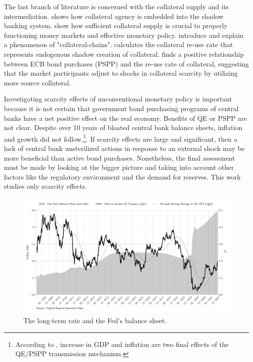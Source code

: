 \documentclass[11pt,a4paper,english,oneside]{article}
\begin{document}
The last branch of literature is concerned with the collateral supply and its intermediation. \citet{singh2011} shows how collateral agency is embedded into the shadow banking system. \citet{sissoko2020} show how sufficient collateral supply is crucial to properly functioning money markets and effective monetary policy. \citet{singh2012} introduce and explain a phenomenon of "collateral-chains". \citet{singh2017} calculates the collateral re-use rate that represents endogenous shadow creation of collateral. \citet{jank2021} finds a positive relationship between ECB bond purchases (PSPP) and the re-use rate of collateral, suggesting that the market participants adjust to shocks in collateral scarcity by utilizing more source collateral.

Investigating scarcity effects of unconventional monetary policy is important because it is not certain that government bond purchasing programs of central banks have a net positive effect on the real economy. Benefits of QE or PSPP are not clear. Despite over 10 years of bloated central bank balance sheets, inflation and growth did not follow.\footnote{According to \citet{gern2015}, increase in GDP and inflation are two final effects of the QE/PSPP transmission mechanism.}. If scarcity effects are large and significant, then a lack of central bank unsterilized actions in response to an external shock may be more beneficial than active bond purchases. Nonetheless, the final assessment must be made by looking at the bigger picture and taking into account other factors like the regulatory environment and the demand for reserves. This work studies only scarcity effects.

\begin{figure}[htb!]
  \begin{center}
    \caption{The long-term rate and the Fed's balance sheet.}
    \label{Feds_BS}
    \includegraphics[width=0.99\linewidth]{fed_bs.pdf}
  \end{center}
\end{figure}
\end{document}
